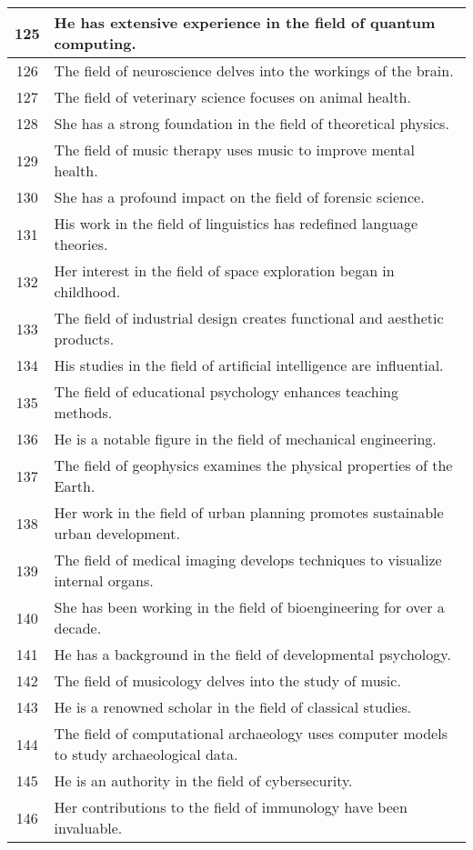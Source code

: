 \begin{longtable}{|c|p{12cm}|}
125 & He has extensive experience in the field of quantum computing. \\ \hline
126 & The field of neuroscience delves into the workings of the brain. \\ \hline
127 & The field of veterinary science focuses on animal health. \\ \hline
128 & She has a strong foundation in the field of theoretical physics. \\ \hline
129 & The field of music therapy uses music to improve mental health. \\ \hline
130 & She has a profound impact on the field of forensic science. \\ \hline
131 & His work in the field of linguistics has redefined language theories. \\ \hline
132 & Her interest in the field of space exploration began in childhood. \\ \hline
133 & The field of industrial design creates functional and aesthetic products. \\ \hline
134 & His studies in the field of artificial intelligence are influential. \\ \hline
135 & The field of educational psychology enhances teaching methods. \\ \hline
136 & He is a notable figure in the field of mechanical engineering. \\ \hline
137 & The field of geophysics examines the physical properties of the Earth. \\ \hline
138 & Her work in the field of urban planning promotes sustainable urban development. \\ \hline
139 & The field of medical imaging develops techniques to visualize internal organs. \\ \hline
140 & She has been working in the field of bioengineering for over a decade. \\ \hline
141 & He has a background in the field of developmental psychology. \\ \hline
142 & The field of musicology delves into the study of music. \\ \hline
143 & He is a renowned scholar in the field of classical studies. \\ \hline
144 & The field of computational archaeology uses computer models to study archaeological data. \\ \hline
145 & He is an authority in the field of cybersecurity. \\ \hline
146 & Her contributions to the field of immunology have been invaluable. \\ \hline

\end{longtable}
